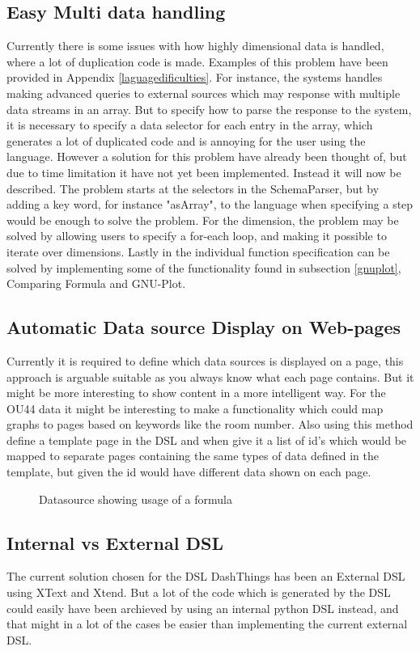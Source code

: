 \subsection{Easy Multi data handling} 
Currently there is some issues with how highly dimensional data is handled, where a lot of
duplication code is made.
Examples of this problem have been provided in Appendix \ref{laguagedificulties}.
For instance, the systems handles making advanced queries to external sources which may response
with multiple data streams in an array. 
But to specify how to parse the response to the system, it is necessary to specify a data
selector for each entry in the array, which generates a lot of duplicated code and is annoying
for the user using the language.
However a solution for this problem have already been thought of, but due to time limitation
it have not yet been implemented. Instead it will now be described.
The problem starts at the selectors in the SchemaParser, but by adding a key word, for instance
"asArray", to the language when specifying a step would be enough to solve the problem.
For the dimension, the problem may be solved by allowing users to specify a for-each loop, and
making it possible to iterate over dimensions.
Lastly in the individual function specification can be solved by implementing some of the
functionality found in subsection \ref{gnuplot}, Comparing Formula and GNU-Plot. 

\subsection{Automatic Data source Display on Web-pages} 
Currently it is required to define
which data sources is displayed on a page, this approach is arguable suitable as you always
know what each page contains. But it might be more interesting to show content in a more
intelligent way. For the OU44 data it might be interesting to make a functionality which could
map graphs to pages based on keywords like the room number. Also using this method define a
template page in the DSL and when give it a list of id's which would be mapped to separate pages
containing the same types of data defined in the template, but given the id would have different
data shown on each page.

\begin{figure}
  \caption{Datasource showing usage of a formula}
  \label{lst:datasource-formula}
  
\end{figure}

\subsection{Internal vs External DSL} The current solution chosen for the DSL DashThings has
been an External DSL using XText and Xtend. But a lot of the code which is generated by the DSL
could easily have been archieved by using an internal python DSL instead, and that might in a lot
of the cases be easier than implementing the current external DSL.
 